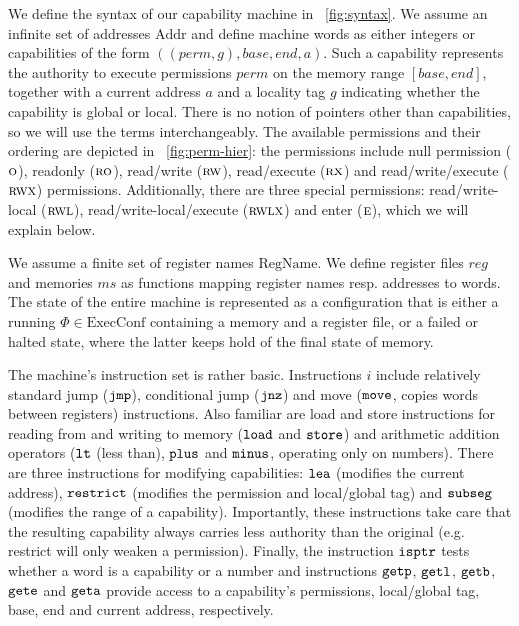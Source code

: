 \documentclass{llncs}
\newcommand\lau[1]{{\color{purple} \sf \footnotesize {LS: #1}}\\}
\renewcommand\lau[1]{}
\newcommand{\var}[1]{\mathit{#1}}
\newcommand{\hs}{\var{ms}}
\newcommand{\ms}{\hs}
\newcommand{\gl}{\var{g}}
\newcommand{\addr}{\var{a}}
\newcommand{\reg}{\var{reg}}
\newcommand{\perm}{\var{perm}}
\newcommand{\plaindom}[1]{\mathrm{#1}}
\newcommand{\Addrs}{\plaindom{Addr}}
\newcommand{\ExecConfs}{\plaindom{ExecConf}}
\newcommand{\RegName}{\plaindom{RegName}}
\newcommand{\zinstr}[1]{\mathtt{#1}}
\newcommand{\oneinstr}[2]{
  \ifthenelse{\equal{#2}{}}
  {\zinstr{#1}}
  {\zinstr{#1} \; #2}
}
\newcommand{\jmp}[1]{\oneinstr{jmp}{#1}}
\newcommand{\twoinstr}[3]{
  \ifthenelse{\equal{#2#3}{}}
  {\zinstr{#1}}
  {\zinstr{#1} \; #2 \; #3}
}
\newcommand{\restricttwo}[2]{\twoinstr{restrict}{#1}{#2}}
\newcommand{\jnz}[2]{\twoinstr{jnz}{#1}{#2}}
\newcommand{\isptr}[2]{\twoinstr{isptr}{#1}{#2}}
\newcommand{\geta}[2]{\twoinstr{geta}{#1}{#2}}
\newcommand{\getb}[2]{\twoinstr{getb}{#1}{#2}}
\newcommand{\gete}[2]{\twoinstr{gete}{#1}{#2}}
\newcommand{\getp}[2]{\twoinstr{getp}{#1}{#2}}
\newcommand{\getl}[2]{\twoinstr{getl}{#1}{#2}}
\newcommand{\move}[2]{\twoinstr{move}{#1}{#2}}
\newcommand{\store}[2]{\twoinstr{store}{#1}{#2}}
\newcommand{\load}[2]{\twoinstr{load}{#1}{#2}}
\newcommand{\lea}[2]{\twoinstr{lea}{#1}{#2}}
\newcommand{\threeinstr}[4]{
  \ifthenelse{\equal{#2#3#4}{}}
  {\zinstr{#1}}
  {\zinstr{#1} \; #2 \; #3 \; #4}
}
\newcommand{\subseg}[3]{\threeinstr{subseg}{#1}{#2}{#3}}
\newcommand{\plus}[3]{\threeinstr{plus}{#1}{#2}{#3}}
\newcommand{\minus}[3]{\threeinstr{minus}{#1}{#2}{#3}}
\newcommand{\lt}[3]{\threeinstr{lt}{#1}{#2}{#3}}
\newcommand{\plainperm}[1]{\textsc{#1}}
\newcommand{\noperm}{\plainperm{o}}
\newcommand{\readonly}{\plainperm{ro}}
\newcommand{\readwrite}{\plainperm{rw}}
\newcommand{\exec}{\plainperm{rx}}
\newcommand{\entry}{\plainperm{e}}
\newcommand{\rwx}{\plainperm{rwx}}
\newcommand{\readwritel}{\plainperm{rwl}}
\newcommand{\rwlx}{\plainperm{rwlx}}
\begin{document}
We define the syntax of our capability machine in \figurename~\ref{fig:syntax}.
We assume an infinite set of addresses $\Addrs$ and define machine words as
either integers or capabilities of the form
$((\perm,\gl),\var{base},\var{end},\addr)$. Such a capability represents the
authority to execute permissions $\perm$ on the memory range
$[\var{base},\var{end}]$, together with a current address $\addr$ and a locality tag
$\gl$ indicating whether the capability is global or local. There is no notion
of pointers other than capabilities, so we will use the terms interchangeably.
The available permissions and their ordering are depicted in
\figurename~\ref{fig:perm-hier}: the permissions include null permission
($\noperm$), readonly ($\readonly$), read/write ($\readwrite$), read/execute
($\exec$) and read/write/execute ($\rwx$) permissions. Additionally, there are
three special permissions: read/write-local ($\readwritel$), read/write-local/execute
($\rwlx$) and enter ($\entry$), which we will explain below.

We assume a finite set of register names $\RegName$. We define register files
$\reg$ and memories $\ms$ as functions mapping register names resp. addresses to
words. The state of the entire machine is represented as a configuration that is
either a running $\Phi \in \ExecConfs$ containing a memory and a register file,
or a failed or halted state, where the latter keeps hold of the final state of
memory.

The machine's instruction set is rather basic. Instructions $i$ include
relatively standard jump ($\jmp{}$), conditional jump ($\jnz{}{}$) and move
($\move{}{}$, copies words between registers) instructions. Also familiar are
load and store instructions for reading from and writing to memory ($\load{}{}$
and $\store{}{}$) and arithmetic addition operators ($\lt{}{}{}$ (less than), $\plus{}{}{}$ and
$\minus{}{}{}$, operating only on numbers). There are three instructions for
modifying capabilities: $\lea{}{}$ (modifies the current address),
$\restricttwo{}{}$ (modifies the permission and local/global tag) and
$\subseg{}{}{}$ (modifies the range of a capability). Importantly, these
instructions take care that the resulting capability always carries less
authority than the original (e.g. restrict will only weaken a permission).
Finally, the instruction $\isptr{}{}$ tests whether a word is a capability or a
number and instructions $\getp{}{}$, $\getl{}{}$, $\getb{}{}$, $\gete{}{}$ and
$\geta{}{}$ provide access to a capability's permissions, local/global tag, base,
end and current address, respectively.
\end{document}
